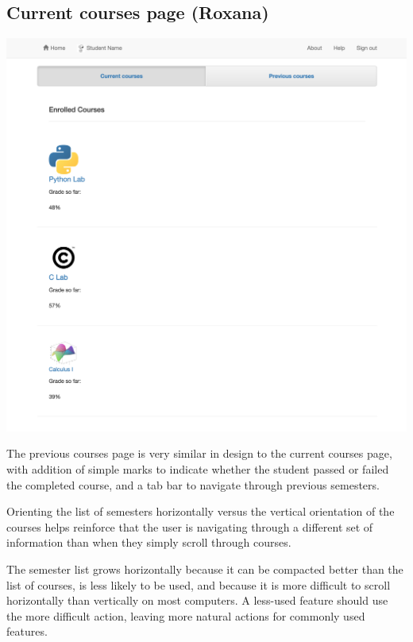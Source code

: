 \subsection{Current courses page (Roxana)}

\includegraphics[width=.75\textwidth]{screenshots/CurrentCourses.png}

The previous courses page is very similar in design to the current courses page, with addition of simple marks to indicate whether the student passed or failed the completed course, and a tab bar to navigate through previous semesters.

Orienting the list of semesters horizontally versus the vertical orientation of the courses helps reinforce that the user is navigating through a different set of information than when they simply scroll through courses.

The semester list grows horizontally because it can be compacted better than the list of courses, is less likely to be used, and because it is more difficult to scroll horizontally than vertically on most computers. A less-used feature should use the more difficult action, leaving more natural actions for commonly used features.